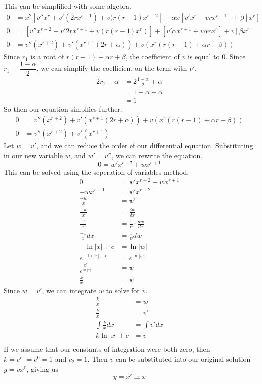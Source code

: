 \documentclass{article}
\theoremstyle{definition}
\begin{document}
    This can be simplified with some algebra.
    \begin{align*}
        0 &= x^2 \left[
            v'' x^r + v' (2 r x^{r-1}) + v (r (r-1) x^{r-2}
        \right] + \alpha x \left[
            v' x^r + v r x^{r-1}
        \right] + \beta \left[ x^r \right]
        \\
        0 &= [v'' x^{r+2} + v'2rx^{r+1} + v(r(r-1)x^r)] +
        [v'\alpha x^{r+1} + v \alpha rx^r] + v[\beta x^r] \\
        0 &= v''(x^{r+2}) + v'(x^{r+1}(2r + \alpha)) + v(x^r(r(r-1) + \alpha r + \beta))
    \end{align*}
    Since $r_1$ is a root of $r(r-1) + \alpha r + \beta$, the coefficient of $v$ is equal to 0. 
    Since $r_1 = \dfrac{1-\alpha}{2}$, we can simplify the coefficient on the term with $v'$.
    \begin{align*}
        2 r_1 + \alpha &= 2 \frac{1-\alpha}{2} + \alpha \\
        &= 1 - \alpha + \alpha \\
        &= 1
    \end{align*}
    So then our equation simplfies further.
    \begin{align*}
        0 &= v''(x^{r+2}) + v'(x^{r+1}(2r + \alpha)) + v(x^r(r(r-1) + \alpha r + \beta)) \\
        0 &= v''(x^{r+2}) + v'(x^{r+1}) 
    \end{align*}
    Let $w = v'$, and we can reduce the order of our differential equation.
    Substituting in our new variable $w$, and $w' = v''$, we can rewrite the equation.
     \[
    0 = w' x^{r+2} + w x^{r+1}
    \] 
    This can be solved using the seperation of variables method.
    \begin{align*}
        0 &= w' x^{r+2} + w x^{r+1} \\
        -w x^{r+1} &= w' x^{r+2} \\
        \frac{-w}{x} &= w' \\
        \frac{-w}{x} &= \frac{dw}{dx} \\
        \frac{-1}{x} &= \frac{1}{w} \cdot \frac{dw}{dx} \\
        \frac{-1}{x}dx &= \frac{1}{w}dw \\ 
        -\ln |x| + c &= \ln |w| \\
        e^{-\ln |x| + c} &= e^{\ln |w|} \\
        \frac{e^c}{e^{\ln |x|}} &= w \\
        \frac{k}{x} &= w 
    \end{align*}
    Since $w = v'$, we can integrate $w$ to solve for $v$.
    \begin{align*}
        \frac{k}{x} &= w \\
        \frac{k}{x} &= v' \\
        \int \frac{k}{x} dx &= \int v' dx \\
        k\ln |x| + c &= v \\
    \end{align*}
    If we assume that our constants of integration were both zero, then $k=e^{c_1} = e^0 = 1$ and $c_2 = 1$. Then $v$ can be substituted into our original solution $y = v x^r$, giving us 
    \[
    y = x^r \ln x
    \] 
\pagebreak
\end{document}

